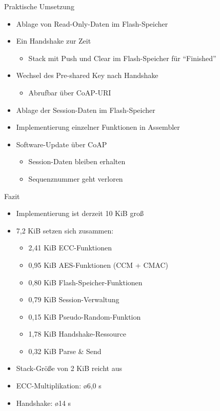 \documentclass{beamer}
\begin{document}
\begin{frame}{Praktische Umsetzung}
  \begin{itemize}
    \item Ablage von Read-Only-Daten im Flash-Speicher
    \item Ein Handshake zur Zeit
    \begin{itemize}
     \item Stack mit Push und Clear im Flash-Speicher für "`Finished"'
    \end{itemize}
    \item Wechsel des Pre-shared Key nach Handshake
    \begin{itemize}
      \item Abrufbar über CoAP-URI
    \end{itemize}
    \item Ablage der Session-Daten im Flash-Speicher
    \item Implementierung einzelner Funktionen in Assembler
    \item Software-Update über CoAP
    \begin{itemize}
      \item Session-Daten bleiben erhalten
      \item Sequenznummer geht verloren
    \end{itemize}
  \end{itemize}
\end{frame}

\begin{frame}{Fazit}
  \begin{itemize}
    \item Implementierung ist derzeit 10 KiB groß
    \item 7,2 KiB setzen sich zusammen:
    \begin{itemize}
      \item 2,41 KiB ECC-Funktionen
      \item 0,95 KiB AES-Funktionen (CCM + CMAC)
      \item 0,80 KiB Flash-Speicher-Funktionen
      \item 0,79 KiB Session-Verwaltung
      \item 0,15 KiB Pseudo-Random-Funktion
      \item 1,78 KiB Handshake-Ressource
      \item 0,32 KiB Parse \& Send
    \end{itemize}
    \item Stack-Größe von 2 KiB reicht aus
    \item ECC-Multiplikation: \o 6,0 s
    \item Handshake: \o 14 s
  \end{itemize}
\end{frame}
\end{document}
